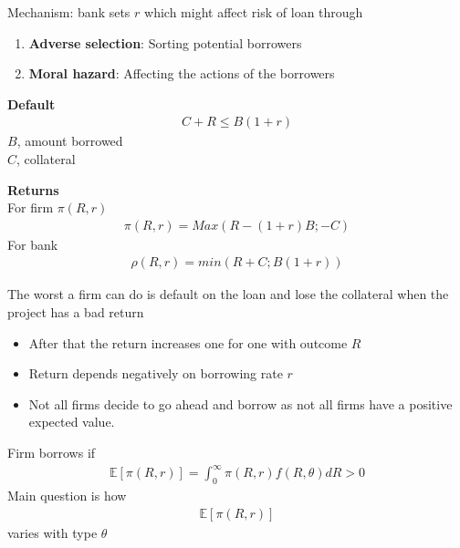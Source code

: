 \documentclass{beamer}
\begin{document}
\begin{frame}
 Mechanism: bank sets $r$ which might affect risk of loan through
\begin{enumerate}
  \item \textbf{Adverse selection}: Sorting potential borrowers
  \item \textbf{Moral hazard}: Affecting the actions of the borrowers
\end{enumerate}
\end{frame}

\begin{frame}
 \textbf{Default} 
\begin{align}
  C+R\leq B(1+r)
\end{align}
\medskip
$B$, amount borrowed\\
$C$, collateral
\end{frame}

\begin{frame}
 \textbf{Returns}\\
 \medskip
 For firm $\pi(R,r)$ 
\begin{align}
  \pi(R,r)=Max(R-(1+r)B;-C)
\end{align}
\medskip
For bank
\begin{align}
  \rho(R,r)=min(R+C;B(1+r))
\end{align}
\end{frame}

\begin{frame}
The worst a firm can do is default on the loan and lose the collateral when the project has a bad return
\begin{itemize}
  \item After that the return increases one for one with outcome $R$
  \item Return depends negatively on borrowing rate $r$
  \item Not all firms decide to go ahead and borrow as not all firms have a positive expected value.
\end{itemize}
\end{frame}

\begin{frame}
Firm borrows if
\begin{align}
  \mathbb{E}[\pi(R,r)]=\int_0^{\infty} \pi(R,r)f(R,\theta)dR>0
\end{align}
\medskip
Main question is how 
\begin{align}
  \mathbb{E}[\pi(R,r)]
\end{align}
\medskip
varies with type $\theta$
\end{frame}
\end{document}

